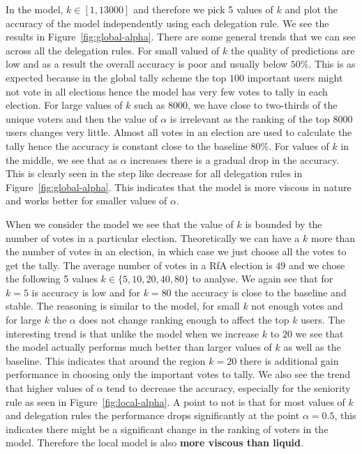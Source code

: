 In the \globalv model, $k \in [1,13000]$ and therefore we pick 5 values of $k$ and plot the accuracy of the model independently using each delegation rule. We see the results in Figure~\ref{fig:global-alpha}. There are some general trends that we can see across all the delegation rules. For small valued of $k$ the quality of predictions are low and as a result the overall accuracy is poor and usually below $50\%$. This is as expected because in the global tally scheme the top $100$ important users might not vote in all elections hence the model has very few votes to tally in each election. For large values of $k$ such as $8000$, we have close to two-thirds of the unique voters and then the value of $\alpha$ is irrelevant as the ranking of the top $8000$ users changes very little. Almost all votes in an election are used to calculate the tally hence the accuracy is constant close to the baseline $80\%$. For values of $k$ in the middle, we see that as $\alpha$ increases there is a gradual drop in the accuracy. This is clearly seen in the step like decrease for all delegation rules in Figure~\ref{fig:global-alpha}. This indicates that the \globalv model is more viscous in nature and works better for smaller values of $\alpha$.

When we consider the \localv model we see that the value of $k$ is bounded by the number of votes in a particular election. Theoretically we can have a $k$ more than the number of votes in an election, in which case we just choose all the votes to get the tally. The average number of votes in a RfA election is $49$ and we chose the following 5 values $k \in \{5,10,20,40,80\}$ to analyse. We again see that for $k=5$ is accuracy is low and for $k=80$ the accuracy is close to the baseline and stable. The reasoning is similar to the \globalv model, for small $k$ not enough votes and for large $k$ the $\alpha$ does not change ranking enough to affect the top $k$ users. The interesting trend is that unlike the \globalv model when we increase $k$ to $20$ we see that the \localv model actually performs much better than larger values of $k$ as well as the baseline. This indicates that around the region $k=20$ there is additional gain performance in choosing only the important votes to tally. We also see the trend that higher values of $\alpha$ tend to decrease the accuracy, especially for the seniority rule as seen in Figure~\ref{fig:local-alpha}. A point to not is that for most values of $k$ and delegation rules the performance drops significantly at the point $\alpha=0.5$, this indicates there might be a significant change in the ranking of voters in the \localv model. Therefore the local model is also \textbf{more viscous than liquid}.

